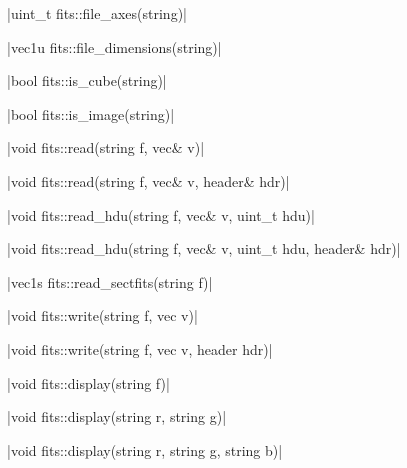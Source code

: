 \item \cppinline|uint_t fits::file_axes(string)| 

\item \cppinline|vec1u fits::file_dimensions(string)| 

\item \cppinline|bool fits::is_cube(string)| 

\item \cppinline|bool fits::is_image(string)| 

\item \cppinline|void fits::read(string f, vec& v)| 

\cppinline|void fits::read(string f, vec& v, header& hdr)|

\cppinline|void fits::read_hdu(string f, vec& v, uint_t hdu)| 

\cppinline|void fits::read_hdu(string f, vec& v, uint_t hdu, header& hdr)|

\item \cppinline|vec1s fits::read_sectfits(string f)| 

\item \cppinline|void fits::write(string f, vec v)| 

\cppinline|void fits::write(string f, vec v, header hdr)|

\item \cppinline|void fits::display(string f)| 

\cppinline|void fits::display(string r, string g)|

\cppinline|void fits::display(string r, string g, string b)|
